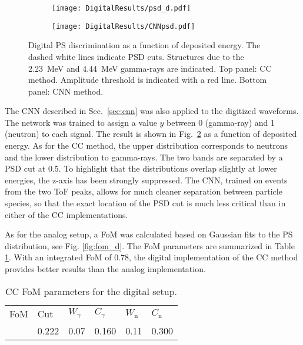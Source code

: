 \documentclass[main.tex]{subfiles}
\begin{document}
\begin{figure}
    \centering
    \begin{subfigure}[ht]{\textwidth}
    	\centering
        \texttt{[image: DigitalResults/psd\_d.pdf]}
        \caption{}
        \label{fig:psd_d}
    \end{subfigure}
	\begin{subfigure}[ht]{\textwidth}
		\centering
        \texttt{[image: DigitalResults/CNNpsd.pdf]}
        \caption{}
    	\label{fig:cnn_E} 
    \end{subfigure}
        \caption[Digital PS discrimination as a function of deposited energy.]{Digital PS discrimination as a function of deposited energy. The dashed white lines indicate PSD cuts. Structures due to the \SI{2.23}{MeV} and \SI{4.44}{MeV} gamma-rays are indicated. Top panel: CC method. Amplitude threshold is indicated with a red line. Bottom panel: CNN method.}
    \label{fig:ccm_cnn}
\end{figure}

The CNN described in Sec.~\ref{sec:cnn} was also applied to the digitized waveforms. The network was trained to assign a value $y$ between 0 (gamma-ray) and 1 (neutron) to each signal. The result is shown in Fig.~\ref{fig:cnn_E} as a function of deposited energy. As for the CC method, the upper distribution corresponds to neutrons and the lower distribution to gamma-rays. The two bands are separated by a PSD cut at 0.5. To highlight that the distributions overlap slightly at lower energies, the z-axis has been strongly suppressed. The CNN, trained on events from the two ToF peaks, allows for much cleaner separation between particle species, so that the exact location of the PSD cut is much less critical than in either of the CC implementations.

As for the analog setup, a FoM was calculated based on Gaussian fits to the PS distribution, see Fig. \ref{fig:fom_d}. The FoM parameters are summarized in Table \ref{tab:fom_d}. With an integrated FoM of 0.78, the digital implementation of the CC method provides better results than the analog implementation.

\begin{table}[h]
\center
\begin{tabular}{|l|l|l|l|l|l|}
\hline
FoM  & Cut   & $W_\gamma$ & $C_\gamma$ & $W_\textrm{n}$ & $C_\textrm{n}$ \\ \hhline{|=|=|=|=|=|=|}
\hline
0.78 & 0.222 & 0.07          & 0.160           & 0.11              & 0.300               \\ \hline
\end{tabular}
\caption{CC FoM parameters for the digital setup.}
\label{tab:fom_d}
\end{table}
\end{document}
